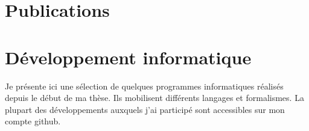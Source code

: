 \documentclass[]{cv-etienne}
\begin{document}
\section{Publications}
\begin{refsection}
  \nocite{*}
  \printbibliography[type=article,title={Articles dans des revues à comité de lecture},heading=subbibliography,sorting=ynt]
  \nocite{*}
  \printbibliography[type=incollection,title={Chapitres de livre},heading=subbibliography,sorting=ynt]
  \nocite{*}
  \printbibliography[type=inproceedings,title={Conférences/posters},heading=subbibliography,sorting=ynt]
\end{refsection}
\section{Développement informatique}
Je présente ici une sélection de quelques programmes informatiques réalisés depuis le début de ma thèse. Ils mobilisent différents langages et formalismes. La plupart des développements auxquels j'ai participé sont accessibles sur mon compte github.
\end{document}
